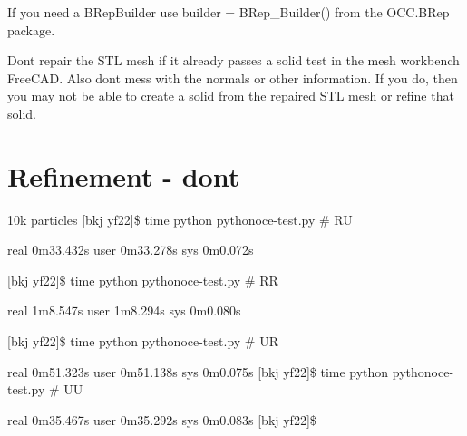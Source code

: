 If you need a B\+Rep\+Builder use builder = B\+Rep\+\_\+\+Builder() from the O\+C\+C.\+B\+Rep package.

Don\textquotesingle{}t repair the S\+TL mesh if it already passes a solid test in the mesh workbench Free\+C\+AD. Also don\textquotesingle{}t mess with the normals or other information. If you do, then you may not be able to create a solid from the repaired S\+TL mesh or refine that solid.

\section*{Refinement -\/ don\textquotesingle{}t }

10k particles \mbox{[}bkj yf22\mbox{]}\$ time python pythonoce-\/test.\+py \# RU

real 0m33.\+432s user 0m33.\+278s sys 0m0.\+072s

\mbox{[}bkj yf22\mbox{]}\$ time python pythonoce-\/test.\+py \# RR

real 1m8.\+547s user 1m8.\+294s sys 0m0.\+080s

\mbox{[}bkj yf22\mbox{]}\$ time python pythonoce-\/test.\+py \# UR

real 0m51.\+323s user 0m51.\+138s sys 0m0.\+075s \mbox{[}bkj yf22\mbox{]}\$ time python pythonoce-\/test.\+py \# UU

real 0m35.\+467s user 0m35.\+292s sys 0m0.\+083s \mbox{[}bkj yf22\mbox{]}\$ 